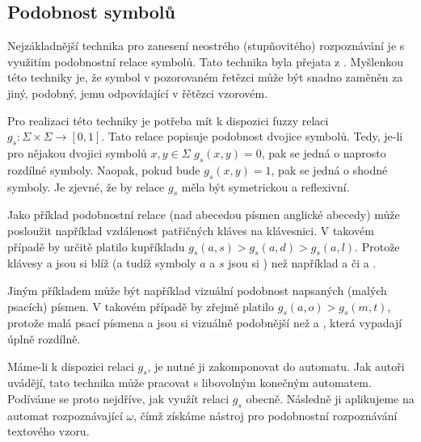\documentclass[a4paper,10pt]{article}
\begin{document}
\subsection{Podobnost symbolů}
Nejzákladnější technika pro zanesení neostrého (stupňovitého) rozpoznávání je s využitím podobnostní relace symbolů. Tato technika byla přejata z \cite{RamGir-ConvFinAutFuzzAutStrComp}. Myšlenkou této techniky je, že symbol v pozorovaném řetězci může být snadno zaměněn za jiný, podobný, jemu odpovídající v řětězci vzorovém.

Pro realizaci této techniky je potřeba mít k dispozici fuzzy relaci $g_s: \Sigma \times \Sigma \rightarrow [0, 1]$. Tato relace popisuje podobnost dvojice symbolů. Tedy, je-li pro nějakou dvojici symbolů $x, y \in \Sigma$  $g_s(x, y) = 0$, pak se jedná o naprosto rozdílné symboly. Naopak, pokud bude $g_s(x, y) = 1$, pak se jedná o shodné symboly. Je zjevné, že by relace $g_s$ měla být symetrickou a reflexivní. 

\begin{example}
 Jako příklad podobnostní relace (nad abecedou písmen anglické abecedy) může posloužit například vzdálenost patřičných kláves na klávesnici. V takovém případě by určitě platilo kupříkladu $g_s(a,s) > g_s(a, d) > g_s(a, l)$. Protože klávesy  a  jsou si blíž (a tudíž symboly $a$ a $s$ jsou si ) než například  a  či  a .
 
 Jiným příkladem může být například vizuální podobnost napsaných (malých psacích) písmen. V takovém případě by zřejmě platilo $g_s(a, o) > g_s(m, t)$, protože malá psací písmena  a  jsou si vizuálně podobnější než  a , která vypadají úplně rozdílně.
\end{example}

Máme-li k dispozici relaci $g_s$, je nutné ji zakomponovat do automatu. Jak autoři uvádějí, tato technika může pracovat s libovolným konečným automatem. Podíváme se proto nejdříve, jak využít relaci $g_s$ obecně. Následně ji aplikujeme na automat rozpoznávající $\omega$, čímž získáme nástroj pro podobnostní rozpoznávání textového vzoru.
\end{document}
